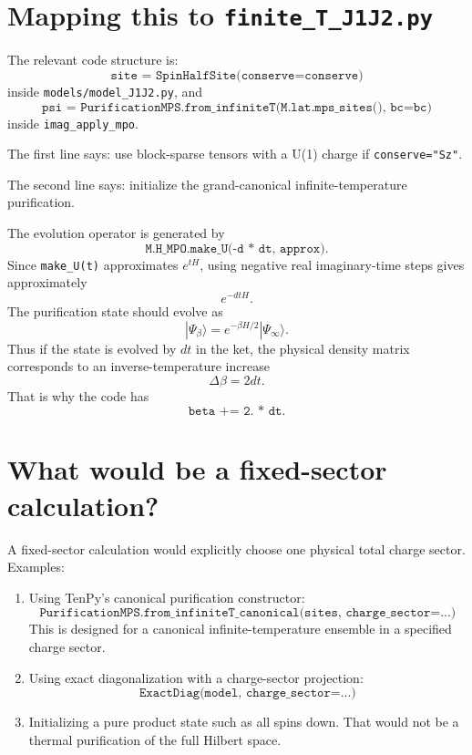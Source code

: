 \documentclass[11pt]{article}
\begin{document}
\section{Mapping this to \texttt{finite\_T\_J1J2.py}}

The relevant code structure is:
\[
\texttt{site = SpinHalfSite(conserve=conserve)}
\]
inside \texttt{models/model\_J1J2.py}, and
\[
\texttt{psi = PurificationMPS.from\_infiniteT(M.lat.mps\_sites(), bc=bc)}
\]
inside \texttt{imag\_apply\_mpo}.

The first line says: use block-sparse tensors with a U(1) charge if
\texttt{conserve="Sz"}.

The second line says: initialize the grand-canonical infinite-temperature
purification.

The evolution operator is generated by
\[
\texttt{M.H\_MPO.make\_U(-d * dt, approx)}.
\]
Since \texttt{make\_U(t)} approximates \(e^{tH}\), using negative real
imaginary-time steps gives approximately
\[
e^{-dt H}.
\]
The purification state should evolve as
\[
|\Psi_\beta\rangle=e^{-\beta H/2}|\Psi_\infty\rangle.
\]
Thus if the state is evolved by \(dt\) in the ket, the physical density matrix
corresponds to an inverse-temperature increase
\[
\Delta\beta = 2dt.
\]
That is why the code has
\[
\texttt{beta += 2. * dt}.
\]

\section{What would be a fixed-sector calculation?}

A fixed-sector calculation would explicitly choose one physical total charge
sector. Examples:

\begin{enumerate}[label=(\alph*)]
\item Using TenPy's canonical purification constructor:
\[
\texttt{PurificationMPS.from\_infiniteT\_canonical(sites, charge\_sector=...)}
\]
This is designed for a canonical infinite-temperature ensemble in a specified
charge sector.

\item Using exact diagonalization with a charge-sector projection:
\[
\texttt{ExactDiag(model, charge\_sector=...)}
\]

\item Initializing a pure product state such as all spins down. That would not be
a thermal purification of the full Hilbert space.
\end{enumerate}
\end{document}
